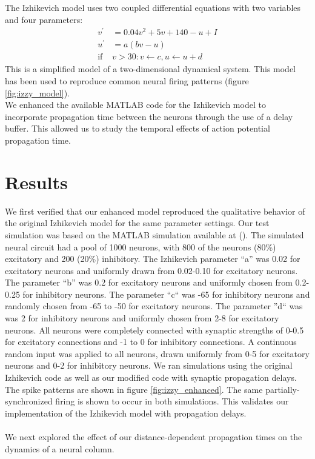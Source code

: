 \documentclass[a4paper,11pt]{article}
\begin{document}
The Izhikevich model uses two coupled differential equations with two variables and four parameters:
\begin{align}
 v^\prime &= 0.04v^2+5v+140-u+I\\
 u^\prime &= a(bv-u)\\
 \text{if } &v>30: v\leftarrow c, u\leftarrow u+d
\end{align}
This is a simplified model of a two-dimensional dynamical system.
This model has been used to reproduce common neural firing patterns (figure \ref{fig:izzy_model}). \\
We enhanced the available MATLAB code for the Izhikevich model to incorporate propagation time between the neurons through the use of a delay buffer.
This allowed us to study the temporal effects of action potential propagation time.
\section{Results}
We first verified that our enhanced model reproduced the qualitative behavior of the original Izhikevich model for the same parameter settings.
Our test simulation was based on the MATLAB simulation available at (\cite{izzy_code}).
The simulated neural circuit had a pool of 1000 neurons, with 800 of the neurons (80\%) excitatory and 200 (20\%) inhibitory.
The Izhikevich parameter ``a'' was 0.02 for excitatory neurons and uniformly drawn from 0.02-0.10 for excitatory neurons.
The parameter ``b'' was 0.2 for excitatory neurons and uniformly chosen from 0.2-0.25 for inhibitory neurons.
The parameter ``c`` was -65 for inhibitory neurons and randomly chosen from -65 to -50 for excitatory neurons.
The parameter ''d`` was was 2 for inhibitory neurons and uniformly chosen from 2-8 for excitatory neurons.
All neurons were completely connected with synaptic strengths of 0-0.5 for excitatory connections and -1 to 0 for inhibitory connections.
A continuous random input was applied to all neurons, drawn uniformly from 0-5 for excitatory neurons and 0-2 for inhibitory neurons.
We ran simulations using the original Izhikevich code as well as our modified code with synaptic propagation delays.
The spike patterns are shown in figure \ref{fig:izzy_enhanced}.
The same partially-synchronized firing is shown to occur in both simulations. 
This validates our implementation of the Izhikevich model with propagation delays.
\\ \\
We next explored the effect of our distance-dependent propagation times on the dynamics of a neural column.
\end{document}

